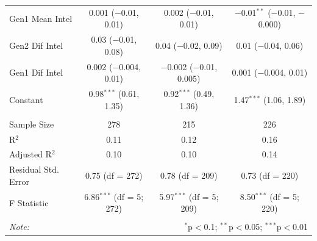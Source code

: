 \documentclass[a4paper,man,apacite,natbib,12pt,longtable]{apa6}\usepackage[]{graphicx}\usepackage[]{color}
\begin{document}
\begin{landscape}
\begin{longtable}{@{\extracolsep{5pt}}lccc}
  Gen1 Mean Intel & 0.001 ($-$0.01, 0.01) & 0.002 ($-$0.01, 0.01) & $-$0.01$^{**}$ ($-$0.01, $-$0.000) \\ 
  Gen2 Dif Intel & 0.03 ($-$0.01, 0.08) & 0.04 ($-$0.02, 0.09) & 0.01 ($-$0.04, 0.06) \\ 
  Gen1 Dif Intel & 0.002 ($-$0.004, 0.01) & $-$0.002 ($-$0.01, 0.005) & 0.001 ($-$0.004, 0.01) \\ 
  Constant & 0.98$^{***}$ (0.61, 1.35) & 0.92$^{***}$ (0.49, 1.36) & 1.47$^{***}$ (1.06, 1.89) \\ 
 \hline \\[-1.8ex] 
Sample Size & 278 & 215 & 226 \\ 
R$^{2}$ & 0.11 & 0.12 & 0.16 \\ 
Adjusted R$^{2}$ & 0.10 & 0.10 & 0.14 \\ 
Residual Std. Error & 0.75 (df = 272) & 0.78 (df = 209) & 0.73 (df = 220) \\ 
F Statistic & 6.86$^{***}$ (df = 5; 272) & 5.97$^{***}$ (df = 5; 209) & 8.50$^{***}$ (df = 5; 220) \\ 
\hline 
\hline \\[-1.8ex] 
\textit{Note:}  & \multicolumn{3}{r}{$^{*}$p$<$0.1; $^{**}$p$<$0.05; $^{***}$p$<$0.01} \\ 
  \end{longtable}
  \end{landscape}
\end{document}
